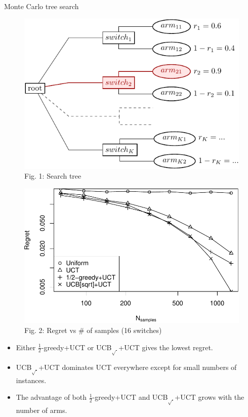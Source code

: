 \documentclass{beamer}
\begin{document}
\begin{frame}{Monte Carlo tree search}

\begin{figure}[h]
  \begin{minipage}[c]{0.4\linewidth}
    \centering
    \includegraphics[scale=0.45]{twolevel-tree.pdf}\\
    {\scriptsize Fig. 1: Search tree}
  \end{minipage}
  \begin{minipage}[c]{0.4\linewidth}
    \centering
    \includegraphics[scale=0.4]{tree-identity-k=16-uqb=8.pdf}\\
    {\scriptsize Fig. 2: Regret vs \# of samples (16 switches)}
  \end{minipage}
  \label{fig:mab-simple-regret}
\end{figure}
\begin{itemize}
\item Either $\frac 1
2$-greedy+UCT or UCB$_{\sqrt{\cdot}}$+UCT
gives the lowest regret.
\item UCB$_{\sqrt{\cdot}}$+UCT dominates UCT everywhere
except for small numbers of instances. 
\item The advantage of both $\frac 1
2$-greedy+UCT and UCB$_{\sqrt{\cdot}}$+UCT grows with the number of
arms.
\end{itemize}
\end{frame}
\end{document}
